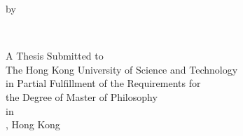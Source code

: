 \thispagestyle{empty}
\null\vskip0.5in
\begin{center}
  \begin{LARGE}
    \thesistitle
  \end{LARGE}
  \vfill
  \vspace{20mm}

  by

  \vspace{4mm}

  \thesisauthor \\
  \vfill
  \vspace{20mm}

  A Thesis Submitted to\\
  The Hong Kong University of Science and Technology \\
  in Partial Fulfillment of the Requirements for\\
  the Degree of Master of Philosophy \\
  in \programname \\
  \vfill \vfill
  \thesisdate, Hong Kong
  \vfill
\end{center}

\vfill
